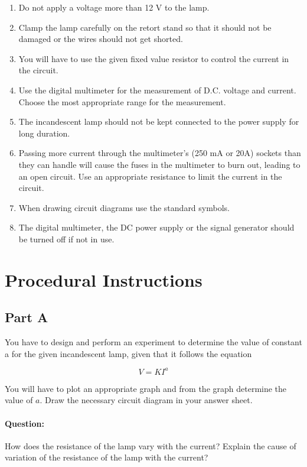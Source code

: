 \begin{enumerate}
\item Do not apply a voltage more than 12 V to the lamp.
\item Clamp the lamp carefully on the retort stand so that it should not be damaged or the wires should not get shorted.
\item You will have to use the given fixed value resistor to control the current in the circuit.
\item Use the digital multimeter for the measurement of D.C. voltage and current.  Choose the most appropriate range for the measurement.
\item The incandescent lamp should not be kept connected to the power supply for long duration. 

\item Passing more current through the multimeter's (250 mA or 20A) sockets than they can handle will cause the fuses in the multimeter to burn out, leading to an open circuit. Use an appropriate resistance to limit the current in the circuit.

\item When drawing circuit diagrams use the standard symbols.

\item The digital multimeter, the DC power supply or the signal generator should be turned off if not in use.

\end{enumerate}


\section*{Procedural Instructions}

\subsection*{Part A}

You have to design and perform an experiment to determine the value of constant a for the given incandescent lamp, given that it follows the equation 

\begin{equation*}
V = K I^a
\end{equation*}

You will have to plot an appropriate graph and from the graph determine the value of $a$. Draw the necessary circuit diagram in your answer sheet.

\paragraph{Question:} How does the resistance of the lamp vary with the current?  Explain the cause of variation of the resistance of the lamp with the current?

